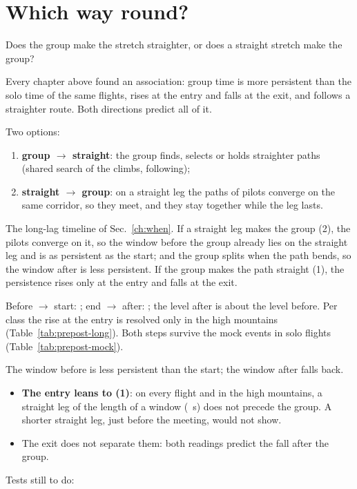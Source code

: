 \documentclass[10pt,a4paper]{article}
\newcommand{\Q}{\item[\textcolor{question}{\textbf{Q.}}]\color{question}}
\newcommand{\Res}{\item[\textcolor{answer}{\textbf{Result.}}]\color{black}}
\newcommand{\Obs}{\item[\textcolor{answer}{\textbf{Observation.}}]\color{black}}
\newcommand{\Hyp}{\item[\textcolor{question}{\textbf{Hypothesis.}}]\color{question}}
\newcommand{\Ded}{\item[\textcolor{answer}{\textbf{Deduction.}}]\color{black}}
\newcommand{\Com}{\item[\textcolor{black}{\textbf{Comment.}}]\color{black}}
\newcommand{\Why}{\item[\textcolor{black}{\textbf{Why.}}]\color{black}}
\newcommand{\Tool}{\item[\textcolor{black}{\textbf{Tool.}}]\color{black}}
\newenvironment{step}{\begin{description}[leftmargin=0pt, itemsep=7pt, topsep=8pt]}{\end{description}}
\begin{document}
\section{Which way round?}\label{which-way}

\begin{step}
\Q Does the group make the stretch straighter, or does a straight stretch make the group?
\Why Every chapter above found an association: group time is more persistent than the solo time of the same flights,
  rises at the entry and falls at the exit, and follows a straighter route. Both directions predict all of it.
\Hyp Two options:
  \begin{enumerate}
  \item \textbf{group $\to$ straight}: the group finds, selects or holds straighter paths (shared search of
    the climbs, following);
  \item \textbf{straight $\to$ group}: on a straight leg the paths of pilots converge on the same corridor,
    so they meet, and they stay together while the leg lasts.
  \end{enumerate}
\Tool The long-lag timeline of Sec.~\ref{ch:when}. If a straight leg makes the group (2), the pilots converge on it,
  so the window before the group already lies on the straight leg and is as persistent as the start; and the group
  splits when the path bends, so the window after is less persistent. If the group makes the path straight (1), the
  persistence rises only at the entry and falls at the exit.
\Res Before $\to$ start: \WhenAllLongStartMinusPre{} \WhenAllLongStartMinusPreBand; end $\to$ after:
  \WhenAllLongPostMinusEnd{} \WhenAllLongPostMinusEndBand; the level after is about the level before. Per class the
  rise at the entry is resolved only in the high mountains (Table~\ref{tab:prepost-long}). Both steps survive the
  mock events in solo flights (Table~\ref{tab:prepost-mock}).
\Obs The window before is less persistent than the start; the window after falls back.
\Ded\mbox{}
  \begin{itemize}
  \item \textbf{The entry leans to (1)}: on every flight and in the high mountains, a straight leg of the length of a
    window (\WhenWindow~s) does not precede the group. A shorter straight leg, just before the meeting, would not
    show.
  \item The exit does not separate them: both readings predict the fall after the group.
  \end{itemize}
\Com Tests still to do:
  \begin{itemize}

\end{itemize}
\end{step}
\end{document}
